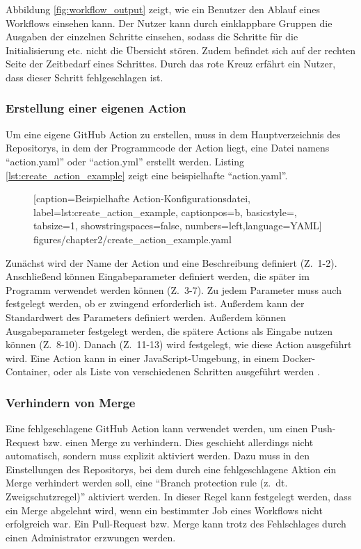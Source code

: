 Abbildung \ref{fig:workflow_output} zeigt, wie ein Benutzer den Ablauf eines Workflows einsehen kann. Der Nutzer kann durch einklappbare Gruppen die Ausgaben der einzelnen Schritte einsehen, sodass die Schritte für die Initialisierung etc. nicht die Übersicht stören. Zudem befindet sich auf der rechten Seite der Zeitbedarf eines Schrittes. Durch das rote Kreuz erfährt ein Nutzer, dass dieser Schritt fehlgeschlagen ist. 


\subsubsection{Erstellung einer eigenen Action}
Um eine eigene GitHub Action zu erstellen, muss in dem Hauptverzeichnis des Repositorys, in dem der Programmcode der Action liegt, eine Datei namens \enquote{action.yaml} oder \enquote{action.yml} erstellt werden. Listing \ref{lst:create_action_example} zeigt eine beispielhafte \enquote{action.yaml}.
	\begin{figure}[h!]
			
			[caption={Beispielhafte Action-Konfigurationsdatei},
			label={lst:create_action_example},
			captionpos=b, basicstyle=\footnotesize, tabsize=1, showstringspaces=false,  numbers=left,language=YAML]
			{figures/chapter2/create_action_example.yaml}
		\end{figure}
Zunächst wird der Name der Action und eine Beschreibung definiert (Z.~1-2). Anschließend können Eingabeparameter definiert werden, die später im Programm verwendet werden können (Z.~3-7). Zu jedem Parameter muss auch festgelegt werden, ob er zwingend erforderlich ist. Außerdem kann der Standardwert des Parameters definiert werden. Außerdem können Ausgabeparameter festgelegt werden, die spätere Actions als Eingabe nutzen können (Z.~8-10). Danach (Z.~11-13) wird festgelegt, wie diese Action ausgeführt wird. Eine Action kann in einer JavaScript-Umgebung, in einem Docker-Container, oder als Liste von verschiedenen Schritten ausgeführt werden \cite[S.~117ff.]{github_action_book}. 

\subsubsection{Verhindern von Merge}

Eine fehlgeschlagene GitHub Action kann verwendet werden, um einen Push-Request bzw.  einen Merge zu verhindern. Dies geschieht allerdings nicht automatisch, sondern muss explizit aktiviert werden. Dazu muss in den Einstellungen des Repositorys, bei dem durch eine fehlgeschlagene Aktion ein Merge verhindert werden soll, eine \enquote{Branch protection rule (z.~dt. Zweigschutzregel)} aktiviert werden. In dieser Regel kann festgelegt werden, dass ein Merge abgelehnt wird, wenn ein bestimmter Job eines Workflows nicht erfolgreich war. Ein Pull-Request bzw. Merge kann trotz des Fehlschlages durch einen Administrator erzwungen werden. 
